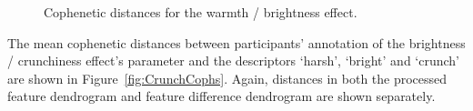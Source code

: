 			\begin{figure}[h!]
				\centering
				\quad
				\caption{Cophenetic distances for the warmth / brightness effect.}
				\label{fig:HarshCophs}
			\end{figure}

			The mean cophenetic distances between participants' annotation of the brightness / crunchiness
			effect's parameter and the descriptors `harsh', `bright' and `crunch' are shown in
			Figure~\ref{fig:CrunchCophs}. Again, distances in both the processed feature dendrogram and feature
			difference dendrogram are shown separately.

